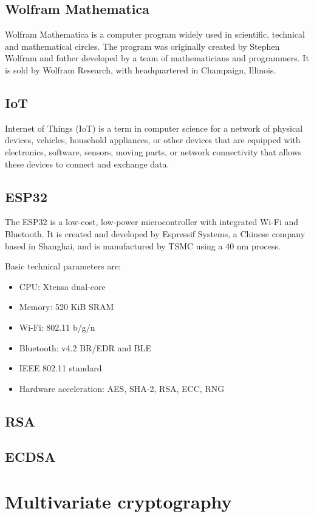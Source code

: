 \documentclass[thesis=M,english]{FITthesis}[2019/12/23]
\begin{document}
\subsection{Wolfram Mathematica}
Wolfram Mathematica is a computer program widely used in scientific, technical and mathematical circles. The program was originally created by Stephen Wolfram and futher developed by a team of mathematicians and programmers. It is sold by Wolfram Research, with headquartered in Champaign, Illinois.

\subsection{IoT}
Internet of Things (IoT) is a term in computer science for a network of physical devices, vehicles, household appliances, or other devices that are equipped with electronics, software, sensors, moving parts, or network connectivity that allows these devices to connect and exchange data.

\subsection{ESP32}
The ESP32 is a low-cost, low-power microcontroller with integrated Wi-Fi and Bluetooth. It is created and developed by Espressif Systems, a Chinese company based in Shanghai, and is manufactured by TSMC using a 40 nm process.

\bigskip
\noindent
Basic technical parameters are:
\begin{itemize}
\item	CPU: Xtensa dual-core
\item	Memory: 520 KiB SRAM
\item	Wi-Fi: 802.11 b/g/n
\item	Bluetooth: v4.2 BR/EDR and BLE
\item	IEEE 802.11 standard
\item	Hardware acceleration: AES, SHA-2, RSA, ECC, RNG
\end{itemize}

\subsection{RSA}
\subsection{ECDSA}

\section{Multivariate cryptography}
\end{document}
